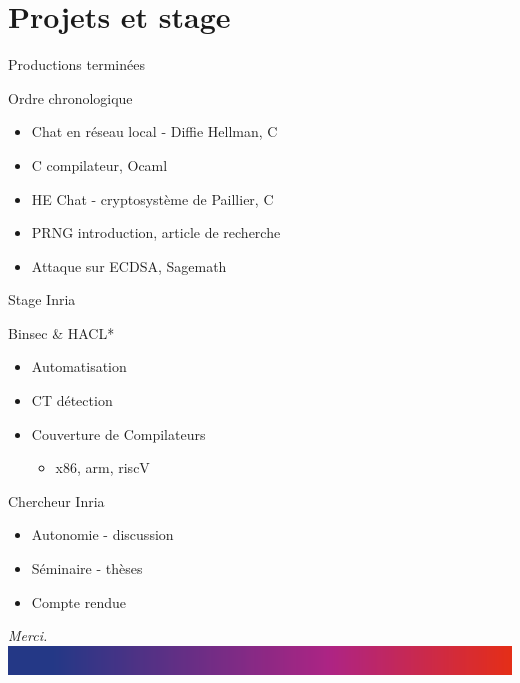 \documentclass[hyperref={bookmarks=false},aspectratio=169]{beamer}
\begin{document}
\section{Projets et stage}

\begin{frame}{Productions terminées}
  \begin{block}{Ordre chronologique}
    \begin{itemize}
      \item<1-> Chat en réseau local - Diffie Hellman, C
      \item<2-> C compilateur, Ocaml
      \item<3-> HE Chat - cryptosystème de Paillier, C
      \item<4-> PRNG introduction, article de recherche
      \item<5-> Attaque sur ECDSA, Sagemath
    \end{itemize}
  \end{block}
\end{frame}

\begin{frame}{Stage Inria}
  \begin{block}{Binsec \& HACL*}
    \begin{itemize}
      \item Automatisation
      \item CT détection
      \item Couverture de Compilateurs
      \begin{itemize}
        \item x86, arm, riscV
      \end{itemize}
    \end{itemize}
  \end{block}
  \pause
  \begin{block}{Chercheur Inria}
    \begin{itemize}
      \item Autonomie - discussion
      \item Séminaire - thèses
      \item Compte rendue
    \end{itemize}
  \end{block}
\end{frame}


\begin{frame}
  \begin{center}
    \Huge 
    \textit{\textcolor{Night_blue}{ Merci.}}\\
    \includegraphics[scale=0.2]{img/Filet-7pt.png}
  \end{center}
\end{frame}
\end{document}

